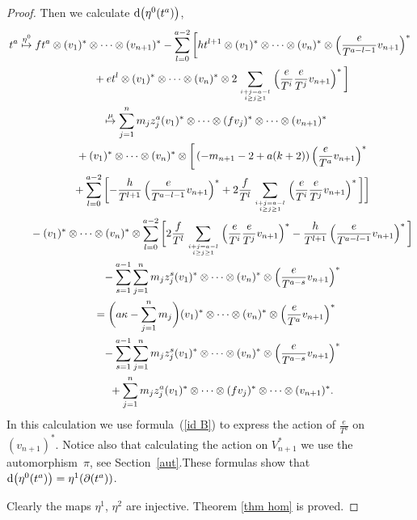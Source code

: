 \documentclass[pdftex]{sigma}
\numberwithin{equation}{section}
\begin{document}
\begin{proof}
Then we calculate ${\rm d}\big(\eta^0(t^a)\big)$,
\begin{gather*}
t^a \overset{\eta^0}\mapsto ft^a\otimes (v_1)^*\otimes\dots\otimes (v_{n+1})^* - \sum_{l=0}^{a-2}\bigg[ht^{l+1}\otimes (v_1)^*\otimes\dots\otimes (v_n)^*\otimes \left(\frac{e}{T^{a-l-1}}v_{n+1}\right)^* \nonumber \\
\hphantom{t^a \overset{\eta^0}\mapsto}{} + et^l\otimes (v_1)^*\otimes\dots\otimes (v_n)^*\otimes 2\sum_{i+j=a-l\atop i\geq j\geq 1} \left(\frac{e}{T^i} \frac{e}{T^j}v_{n+1}\right)^* \bigg]
\nonumber \\
\hphantom{t^a}{}
\overset{\mu} \mapsto 	 \sum_{j=1}^n m_j z_j^a (v_1)^* \otimes \dots \otimes (f v_j)^* \otimes\dots\otimes (v_{n+1})^* \nonumber \\
\hphantom{t^a \overset{\eta^0}\mapsto}{} + (v_1)^* \otimes \dots \otimes (v_n)^* \otimes \bigg[\left(-m_{n+1}-2+a(k+2)\right) \left(\frac{e}{T^a}v_{n+1} \right)^* \nonumber \\
\hphantom{t^a \overset{\eta^0}\mapsto}{}+ \sum_{l=0}^{a-2} \bigg[{-} \frac{h}{T^{l+1}} \left(\frac{e}{T^{a-l-1}} v_{n+1} \right)^* + 2\frac{f}{T^l} \sum_{i+j=a-l\atop i\geq j\geq1} \left(\frac{e}{T^i} \frac{e}{T^j} v_{n+1} \right)^* \bigg] \bigg] \nonumber \\
\hphantom{t^a \overset{\eta^0}\mapsto}{}
-(v_1)^*\otimes\dots\otimes (v_n)^* \otimes \sum_{l=0}^{a-2} \bigg[ 2\frac{f}{T^l} \sum_{i+j=a-l\atop i\geq j\geq1} \left(\frac{e}{T^i} \frac{e}{T^j} v_{n+1} \right)^* - \frac{h}{T^{l+1}} \left(\frac{e}{T^{a-l-1}} v_{n+1} \right)^* \bigg] \nonumber \\
\hphantom{t^a \overset{\eta^0}\mapsto}{} - \sum_{s=1}^{a-1} \sum_{j=1}^n m_j z_j^s (v_1)^* \otimes \dots \otimes (v_n)^* \otimes \left(\frac{e}{T^{a-s}} v_{n+1}\right)^* \nonumber \\
\hphantom{t^a}{} = \bigg(a\kappa - \sum_{j=1}^n m_j\bigg) (v_1)^* \otimes \dots \otimes (v_n)^* \otimes \left(\frac{e}{T^a} v_{n+1}\right)^* \nonumber \\
\hphantom{t^a \overset{\eta^0}\mapsto}{} - \sum_{s=1}^{a-1} \sum_{j=1}^n m_j z_j^s (v_1)^* \otimes \dots \otimes (v_n)^* \otimes \left(\frac{e}{T^{a-s}} v_{n+1}\right)^* \nonumber \\
\hphantom{t^a \overset{\eta^0}\mapsto}{} + \sum_{j=1}^n m_j z_j^a (v_1)^* \otimes \dots \otimes (f v_j)^* \otimes\dots\otimes (v_{n+1})^*. \nonumber
\end{gather*}
In this calculation we use formula~(\ref{id B}) to express the action of $\frac{e}{T^a}$ on $(v_{n+1})^*$. Notice also that calculating the action on $V_{n+1}^*$ we use the automorphism~$\pi$, see Section~\ref{aut}.These formulas show that ${\rm d}\big(\eta^0(t^a)\big) = \eta^1(\partial(t^a))$.

Clearly the maps $\eta^1$, $\eta^2$ are injective. Theorem \ref{thm hom} is proved.
\end{proof}
\end{document}
